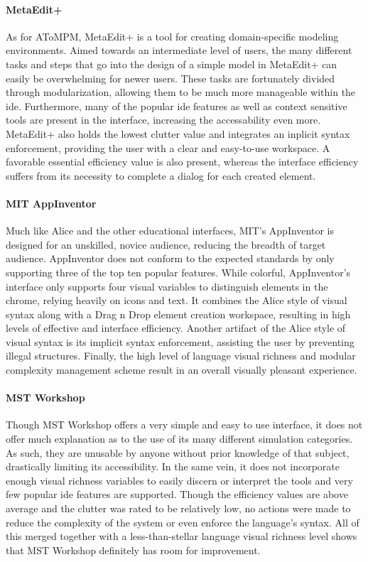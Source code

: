 \paragraph{MetaEdit+} As for AToMPM, MetaEdit+ is a tool for creating domain-specific modeling environments.
Aimed towards an intermediate level of users, the
many different tasks and steps that go into the design of a simple model in
MetaEdit+ can easily be overwhelming for newer users.  These tasks are
fortunately divided through modularization, allowing them to be much more
manageable within the \ac{ide}. Furthermore, many of the popular \ac{ide}
features as well as context sensitive tools are present in the interface,
increasing the accessability even more. MetaEdit+ also holds the lowest
clutter value and integrates an inplicit syntax enforcement, providing the
user with a clear and easy-to-use workspace. A favorable essential
efficiency value is also present, whereas the interface efficiency suffers
from its necessity to complete a dialog for each created element.

\paragraph{MIT AppInventor} Much like Alice and the other educational
interfaces, MIT's AppInventor is designed for an unskilled, novice
audience, reducing the breadth of target audience. AppInventor does not conform to the expected standards by only supporting three
of the top ten popular features. While colorful,
AppInventor's interface only supports four visual variables to distinguish
elements in the chrome, relying heavily on icons and text. It
combines the Alice style of visual syntax along with a Drag n
Drop element creation workspace, resulting in high levels of effective and
interface efficiency. Another artifact of the Alice style of
visual syntax is its implicit syntax enforcement, assisting the user by
preventing illegal structures. Finally, the high level of language visual
richness and modular complexity management scheme result in an overall
visually pleasant experience.

\paragraph{MST Workshop} Though MST Workshop offers a very simple and easy
to use interface, it does not offer much explanation as to the use of its
many different simulation categories. As such, they are unusable
by anyone without prior knowledge of that subject, drastically limiting its
accessibility. In the same vein, it does not incorporate enough visual
richness variables to easily discern or interpret the tools and very few
popular \ac{ide} features are supported. Though the efficiency values are
above average and the clutter was rated to be relatively low, no
actions were made to reduce the complexity of the system or even enforce
the language's syntax. All of this merged together with a less-than-stellar
language visual richness level shows that MST Workshop definitely has room
for improvement.

